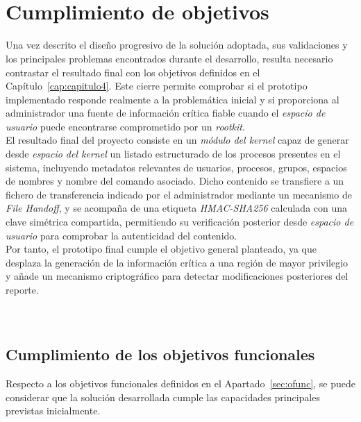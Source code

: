 \

\

\section{Cumplimiento de objetivos}

Una vez descrito el diseño progresivo de la solución adoptada, sus validaciones y los principales problemas encontrados durante el desarrollo, resulta necesario contrastar el resultado final con los objetivos definidos en el Capítulo~\ref{cap:capitulo4}.
Este cierre permite comprobar si el prototipo implementado responde realmente a la problemática inicial y si proporciona al administrador una fuente de información crítica fiable cuando el \textit{espacio de usuario} puede encontrarse comprometido por un \textit{rootkit}.\\

El resultado final del proyecto consiste en un \textit{módulo del kernel} capaz de generar desde \textit{espacio del kernel} un listado estructurado de los procesos presentes en el sistema, incluyendo metadatos relevantes de usuarios, procesos, grupos, espacios de nombres y nombre del comando asociado.
Dicho contenido se transfiere a un fichero de transferencia indicado por el administrador mediante un mecanismo de \textit{File Handoff}, y se acompaña de una etiqueta \textit{HMAC-SHA256} calculada con una clave simétrica compartida, permitiendo su verificación posterior desde \textit{espacio de usuario} para comprobar la autenticidad del contenido.\\

Por tanto, el prototipo final cumple el objetivo general planteado, ya que desplaza la generación de la información crítica a una región de mayor privilegio y añade un mecanismo criptográfico para detectar modificaciones posteriores del reporte.\\\\

\

\subsection{Cumplimiento de los objetivos funcionales}

Respecto a los objetivos funcionales definidos en el Apartado~\ref{sec:ofunc}, se puede considerar que la solución desarrollada cumple las capacidades principales previstas inicialmente.\\

